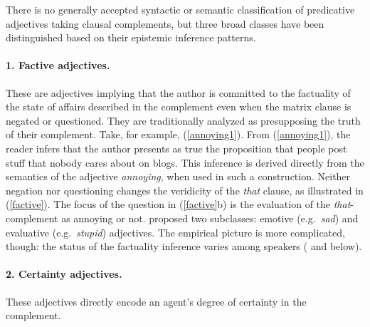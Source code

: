 \documentclass[10pt]{article}
\begin{document}
There is no generally accepted syntactic or semantic classification of predicative adjectives taking clausal complements, but three broad classes have been distinguished based on their epistemic inference patterns. 

\vspace{-.2in}
\paragraph{1. Factive adjectives.} These are adjectives  implying that the author is committed to the factuality of the state of affairs described in the complement even when the matrix clause is negated or questioned. They are traditionally analyzed as presupposing the truth of their complement.
Take, for example, (\ref{annoying1}).
 \vspace{-.1in}
 \vspace{-.1in}
From (\ref{annoying1}), the reader infers that the author presents as true the proposition that people post stuff that nobody cares about on blogs.
This inference is derived directly from the semantics of the adjective {\it annoying}, when used in such a construction. 
Neither negation nor questioning changes the veridicity of the \emph{that }clause, as illustrated in (\ref{factive}).  The focus of the question in (\ref{factive}b) is the evaluation of the \textit{that}-complement as annoying or not.
 \vspace{-.1in}
 \vspace{-.1in}
\cite{norrick:1978} proposed two subclasses: emotive (e.g.\ \textit{sad}) and evaluative (e.g.\ \textit{stupid}) adjectives. The empirical picture is more complicated, though: the status of the factuality inference varies among speakers (\cite{csli-gang-cssp13} and below).
\vspace{-.2in}
\paragraph{2. Certainty adjectives.} \hspace{-.1in}These adjectives directly encode an agent's degree of certainty in the complement.
\end{document}
